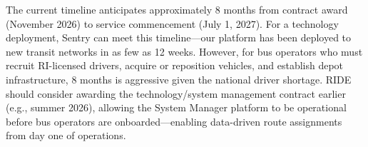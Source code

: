 \begin{description}[style=nextline, leftmargin=0.5cm]
    \item[\faIcon{clock} \textbf{Extended Transition Period:}] The current timeline anticipates approximately 8 months from contract award (November 2026) to service commencement (July 1, 2027). For a technology deployment, Sentry can meet this timeline---our platform has been deployed to new transit networks in as few as 12 weeks. However, for bus operators who must recruit RI-licensed drivers, acquire or reposition vehicles, and establish depot infrastructure, 8 months is aggressive given the national driver shortage. RIDE should consider awarding the technology/system management contract earlier (e.g., summer 2026), allowing the System Manager platform to be operational before bus operators are onboarded---enabling data-driven route assignments from day one of operations.
\end{description}
